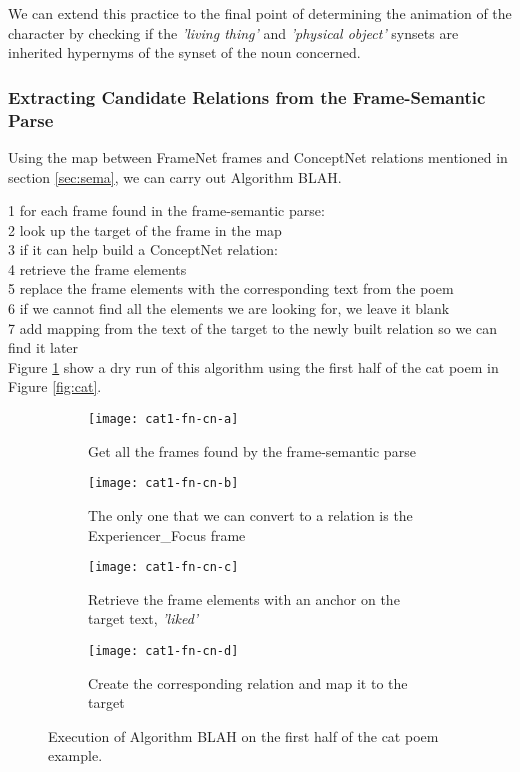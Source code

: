 We can extend this practice to the final point of determining the animation of the character by checking if the \textit{'living thing'} and \textit{'physical object'} synsets are inherited hypernyms of the synset of the noun concerned.


\subsubsection{Extracting Candidate Relations from the Frame-Semantic Parse}
\label{sec:candidate}

Using the map between FrameNet frames and ConceptNet relations mentioned in section \ref{sec:sema}, we can carry out Algorithm BLAH.

1 for each frame found in the frame-semantic parse:\\
2	look up the target of the frame in the map\\
3	if it can help build a ConceptNet relation:	\\
4		retrieve the frame elements\\
5		replace the frame elements with the corresponding text from the poem\\
6			if we cannot find all the elements we are looking for, we leave it blank\\
7		add mapping from the text of the target to the newly built relation so we can find it later\\
	
Figure \ref{fig:cat1-fn-cn} show a dry run of this algorithm using the first half of the cat poem in Figure \ref{fig:cat}.

\begin{figure}[H]
\centering
\begin{subfigure}[t]{0.9\textwidth}
	\centering
    \texttt{[image: cat1-fn-cn-a]}
    \caption{Get all the frames found by the frame-semantic parse}
\end{subfigure}
\begin{subfigure}[t]{0.9\textwidth}
	\centering
    \texttt{[image: cat1-fn-cn-b]}
    \caption{The only one that we can convert to a relation is the Experiencer\_Focus frame}
\end{subfigure}
\begin{subfigure}[t]{0.9\textwidth}
	\centering
    \texttt{[image: cat1-fn-cn-c]}
    \caption{Retrieve the frame elements with an anchor on the target text, \textit{'liked'}}
\end{subfigure}
\begin{subfigure}[t]{0.9\textwidth}
	\centering
    \texttt{[image: cat1-fn-cn-d]}
    \caption{Create the corresponding relation and map it to the target}
\end{subfigure}
\caption{Execution of Algorithm BLAH on the first half of the cat poem example.}
\label{fig:cat1-fn-cn}
\end{figure}

